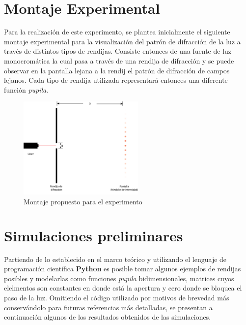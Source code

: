 \documentclass{article}
\begin{document}
\section{Montaje Experimental}
Para la realización de este experimento, se plantea inicialmente el siguiente montaje experimental para la visualización del patrón de difracción de la luz a través de distintos tipos de rendijas. Consiste entonces de una fuente de luz monocromática la cual pasa a través de una rendija de difracción y se puede observar en la pantalla lejana a la rendij el patrón de difracción de campos lejanos. Cada tipo de rendija utilizada representará entonces una diferente función \textit{pupila}.


\begin{figure}[H]
\centering
\includegraphics[width=0.55\textwidth]{Montaje.png}
\caption{Montaje propuesto para el experimento} \label{fig:montaje}
\end{figure}

\section{Simulaciones preliminares}
Partiendo de lo establecido en el marco teórico y utilizando el lenguaje de programación científica \textbf{Python} es posible tomar algunos ejemplos de rendijas posibles y modelarlas como funciones \textit{pupila} bidimensionales, matrices cuyos elelmentos son constantes en donde está la apertura y cero donde se bloquea el paso de la luz. Omitiendo el código utilizado por motivos de brevedad más conservándolo para futuras referencias más detalladas, se presentan a continuación algunos de los resultados obtenidos de las simulaciones.
\end{document}
